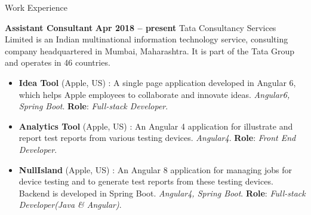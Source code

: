 \documentclass{resume}
\begin{document}
\begin{category}{Work Experience}
  
  \citemnobullet \textbf{Assistant Consultant} \hfill \textbf{Apr 2018 -- present}
  \citemnobullet Tata Consultancy Services Limited is an Indian multinational information technology service, consulting company headquartered in Mumbai, Maharashtra. It is part of the Tata Group and operates in 46 countries.
  \begin{itemize}
  \item \textbf{Idea Tool} (Apple, US) : A single page application developed in Angular 6, which helps Apple employees to collaborate and innovate ideas. {\em Angular6, Spring Boot}. \textbf{Role}: {\em Full-stack Developer}. 
  \item \textbf{Analytics Tool} (Apple, US) : An Angular 4 application for illustrate and report test reports from various testing devices. {\em Angular4}. \textbf{Role}: {\em Front End Developer}. 
  \item \textbf{NullIsland} (Apple, US) : An Angular 8 application for managing jobs for device testing and to generate test reports from these testing devices. Backend is developed in Spring Boot. {\em Angular4, Spring Boot}. \textbf{Role}: {\em Full-stack Developer(Java \& Angular)}. 
  \end{itemize}


\end{category}
\end{document}
